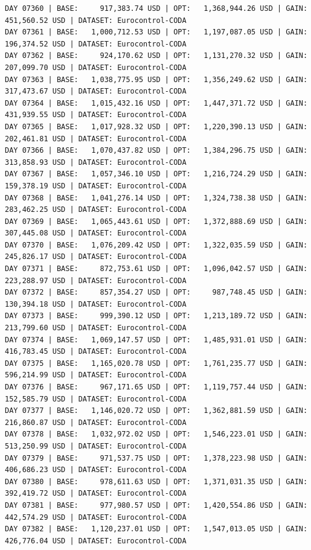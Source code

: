 \documentclass[11pt,a4paper]{article}
\begin{document}
\begin{verbatim}
DAY 07360 | BASE:     917,383.74 USD | OPT:   1,368,944.26 USD | GAIN: 451,560.52 USD | DATASET: Eurocontrol-CODA
DAY 07361 | BASE:   1,000,712.53 USD | OPT:   1,197,087.05 USD | GAIN: 196,374.52 USD | DATASET: Eurocontrol-CODA
DAY 07362 | BASE:     924,170.62 USD | OPT:   1,131,270.32 USD | GAIN: 207,099.70 USD | DATASET: Eurocontrol-CODA
DAY 07363 | BASE:   1,038,775.95 USD | OPT:   1,356,249.62 USD | GAIN: 317,473.67 USD | DATASET: Eurocontrol-CODA
DAY 07364 | BASE:   1,015,432.16 USD | OPT:   1,447,371.72 USD | GAIN: 431,939.55 USD | DATASET: Eurocontrol-CODA
DAY 07365 | BASE:   1,017,928.32 USD | OPT:   1,220,390.13 USD | GAIN: 202,461.81 USD | DATASET: Eurocontrol-CODA
DAY 07366 | BASE:   1,070,437.82 USD | OPT:   1,384,296.75 USD | GAIN: 313,858.93 USD | DATASET: Eurocontrol-CODA
DAY 07367 | BASE:   1,057,346.10 USD | OPT:   1,216,724.29 USD | GAIN: 159,378.19 USD | DATASET: Eurocontrol-CODA
DAY 07368 | BASE:   1,041,276.14 USD | OPT:   1,324,738.38 USD | GAIN: 283,462.25 USD | DATASET: Eurocontrol-CODA
DAY 07369 | BASE:   1,065,443.61 USD | OPT:   1,372,888.69 USD | GAIN: 307,445.08 USD | DATASET: Eurocontrol-CODA
DAY 07370 | BASE:   1,076,209.42 USD | OPT:   1,322,035.59 USD | GAIN: 245,826.17 USD | DATASET: Eurocontrol-CODA
DAY 07371 | BASE:     872,753.61 USD | OPT:   1,096,042.57 USD | GAIN: 223,288.97 USD | DATASET: Eurocontrol-CODA
DAY 07372 | BASE:     857,354.27 USD | OPT:     987,748.45 USD | GAIN: 130,394.18 USD | DATASET: Eurocontrol-CODA
DAY 07373 | BASE:     999,390.12 USD | OPT:   1,213,189.72 USD | GAIN: 213,799.60 USD | DATASET: Eurocontrol-CODA
DAY 07374 | BASE:   1,069,147.57 USD | OPT:   1,485,931.01 USD | GAIN: 416,783.45 USD | DATASET: Eurocontrol-CODA
DAY 07375 | BASE:   1,165,020.78 USD | OPT:   1,761,235.77 USD | GAIN: 596,214.99 USD | DATASET: Eurocontrol-CODA
DAY 07376 | BASE:     967,171.65 USD | OPT:   1,119,757.44 USD | GAIN: 152,585.79 USD | DATASET: Eurocontrol-CODA
DAY 07377 | BASE:   1,146,020.72 USD | OPT:   1,362,881.59 USD | GAIN: 216,860.87 USD | DATASET: Eurocontrol-CODA
DAY 07378 | BASE:   1,032,972.02 USD | OPT:   1,546,223.01 USD | GAIN: 513,250.99 USD | DATASET: Eurocontrol-CODA
DAY 07379 | BASE:     971,537.75 USD | OPT:   1,378,223.98 USD | GAIN: 406,686.23 USD | DATASET: Eurocontrol-CODA
DAY 07380 | BASE:     978,611.63 USD | OPT:   1,371,031.35 USD | GAIN: 392,419.72 USD | DATASET: Eurocontrol-CODA
DAY 07381 | BASE:     977,980.57 USD | OPT:   1,420,554.86 USD | GAIN: 442,574.29 USD | DATASET: Eurocontrol-CODA
DAY 07382 | BASE:   1,120,237.01 USD | OPT:   1,547,013.05 USD | GAIN: 426,776.04 USD | DATASET: Eurocontrol-CODA

\end{verbatim}
\end{document}
